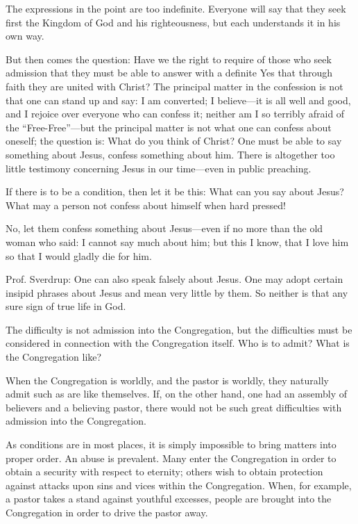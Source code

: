The expressions in the point are too indefinite. Everyone will say that they seek first the Kingdom of God and his righteousness, but each understands it in his own way.

But then comes the question: Have we the right to require of those who seek admission that they must be able to answer with a definite Yes that through faith they are united with Christ? The principal matter in the confession is not that one can stand up and say: I am converted; I believe—it is all well and good, and I rejoice over everyone who can confess it; neither am I so terribly afraid of the “Free-Free”—but the principal matter is not what one can confess about oneself; the question is: What do you think of Christ? One must be able to say something about Jesus, confess something about him. There is altogether too little testimony concerning Jesus in our time—even in public preaching.

If there is to be a condition, then let it be this: What can you say about Jesus? What may a person not confess about himself when hard pressed!

No, let them confess something about Jesus—even if no more than the old woman who said: I cannot say much about him; but this I know, that I love him so that I would gladly die for him.

Prof. Sverdrup: One can also speak falsely about Jesus. One may adopt certain insipid phrases about Jesus and mean very little by them. So neither is that any sure sign of true life in God.

The difficulty is not admission into the Congregation, but the difficulties must be considered in connection with the Congregation itself. Who is to admit? What is the Congregation like?

When the Congregation is worldly, and the pastor is worldly, they naturally admit such as are like themselves. If, on the other hand, one had an assembly of believers and a believing pastor, there would not be such great difficulties with admission into the Congregation.

As conditions are in most places, it is simply impossible to bring matters into proper order. An abuse is prevalent. Many enter the Congregation in order to obtain a security with respect to eternity; others wish to obtain protection against attacks upon sins and vices within the Congregation. When, for example, a pastor takes a stand against youthful excesses, people are brought into the Congregation in order to drive the pastor away.

